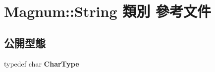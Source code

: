 \hypertarget{class_magnum_1_1_string}{}\section{Magnum\+:\+:String 類別 參考文件}
\label{class_magnum_1_1_string}
\subsection*{公開型態}
\begin{DoxyCompactItemize}
\item 
typedef char {\bfseries Char\+Type}\hypertarget{class_magnum_1_1_string_ab39c04776fa4c79bf180ae35d9c790be}{}\label{class_magnum_1_1_string_ab39c04776fa4c79bf180ae35d9c790be}

\end{DoxyCompactItemize}
